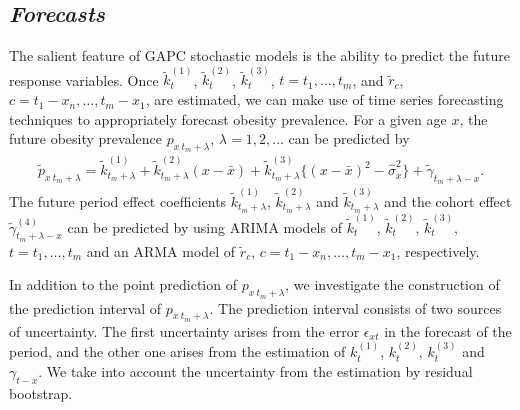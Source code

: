 \documentclass[11pt,letterpaper]{article}
\numberwithin{equation}{section}
\begin{document}
\subsection{\textit{Forecasts}}

The salient feature of  GAPC stochastic models is the ability to predict the future response variables. Once $\tilde{k}_t^{(1)}$, $\tilde{k}_t^{(2)}$, $\tilde{k}_t^{(3)}$, $t=t_1,\dots,t_m$, and $\tilde{r}_{c}$, $c= t_1-x_n,\dots,t_m-x_1$, are estimated, we can make use of time series forecasting techniques to appropriately forecast obesity prevalence. For a given age $x$, the future obesity prevalence $p_{x~t_m+\lambda}$, $\lambda=1,2,\dots$ can be predicted by
\begin{eqnarray}\label{forecast}
\tilde{p}_{x~t_m+\lambda}=\tilde{k}_{t_m+\lambda}^{(1)}+ \tilde{k}_{t_m+\lambda}^{(2)}(x - \bar{x}) + \tilde{k}_{t_m+\lambda}^{(3)}\{(x - \bar{x})^{2} - \hat\sigma_x^{2}\} + \tilde{\gamma}_{{t_m+\lambda}-x}.
\end{eqnarray}
The future period effect coefficients $\tilde{k}_{t_m+\lambda}^{(1)}$, $\tilde{k}_{t_m+\lambda}^{(2)} $ and $\tilde{k}_{t_m+\lambda}^{(3)}$ and the cohort effect $\tilde{\gamma}_{{t_m+\lambda}-x}^{(4)}$  can be predicted by using  ARIMA models of $\tilde{k}_t^{(1)}$, $\tilde{k}_t^{(2)}$, $\tilde{k}_t^{(3)}$, $t=t_1,\dots,t_m$  and an ARMA model of $\tilde{r}_{c}$, $c= t_1-x_n,\dots,t_m-x_1$, respectively.

In addition to the point prediction of $p_{x~t_m+\lambda}$, we investigate the construction of the prediction interval of $ p_{x~t_m+\lambda}$. The prediction interval consists of two sources of uncertainty. The first uncertainty arises from the error $\epsilon_{xt}$ in the forecast of the period, and the other one arises from the estimation of $k_t^{(1)}$, $k_t^{(2)}$, $k_t^{(3)}$ and   $\gamma_{t-x}$. We take into account the uncertainty from the estimation  by residual bootstrap.
\end{document}
